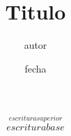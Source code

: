 \documentclass[a4paper]{article}
\title{Titulo}
\author{autor}
\date{fecha}
\begin{document}
 

	$$
		\stackrel {escritura superior}{escritura base} %
	$$
\end{document}
